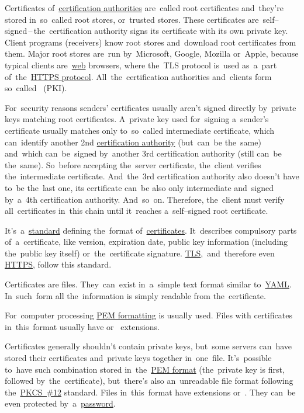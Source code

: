 Certificates of~\hyperref[certificationauthority]{certification authorities} are~called root certificates and~they're stored in~so~called root stores, or~trusted stores.
These certificates are~self--signed\,--\,the~certification authority signs its certificate with its own private key.
Client programs (receivers) know root stores and~download root certificates from them.
Major root stores are~run by~Microsoft, Google, Mozilla or~Apple, because typical clients are~\hyperref[internetweb]{web} browsers, where the~TLS protocol is~used as~a~part of~the~\hyperref[https]{HTTPS protocol}.
All~the~certification authorities and~clients form so~called ~(PKI).

For~security reasons senders' certificates usually aren't signed directly by~private keys matching root certificates.
A~private key used for~signing a~sender's certificate usually matches only to~so~called intermediate certificate, which can~identify another 2nd \hyperref[certificationauthority]{certification authority} (but~can~be the~same) and~which can~be~signed by~another 3rd certification authority (still can~be the~same).
So~before accepting the~server certificate, the~client verifies the~intermediate certificate.
And~the~3rd certification authority also doesn't have to~be the~last one, its certificate can~be also only intermediate and~signed by~a~4th certification authority.
And~so~on.
Therefore, the~client must verify all~certificates in~this chain until it~reaches a~self--signed root certificate.

\label{x509}
It's~a~\hyperref[protocolstandard]{standard} defining the~format of~\hyperref[certificate]{certificates}.
It~describes compulsory parts of~a~certificate, like version, expiration date, public key information (including the~public key itself) or~the~certificate signature.
\hyperref[tls]{TLS},~and~therefore even \hyperref[https]{HTTPS}, follow this standard.

Certificates are files.
They~can~exist in~a~simple text format similar to~\hyperref[yaml]{YAML}.
In~such~form all the~information is simply readable from the~certificate.

For~computer processing \hyperref[pem]{PEM formatting} is usually used.
Files with certificates in~this~format usually have  or~ extensions.

Certificates generally shouldn't contain private keys, but~some servers can~have stored their certificates and~private keys together in~one~file.
It's~possible to~have such combination stored in~the~\hyperref[pem]{PEM format} (the~private key is first, followed by~the~certificate), but~there's also an~unreadable file format following the~\hyperref[pkcs]{PKCS~\#12} standard.
Files in~this~format have extensions  or~.
They can~be even protected by~a~\hyperref[keypassword]{password}.

